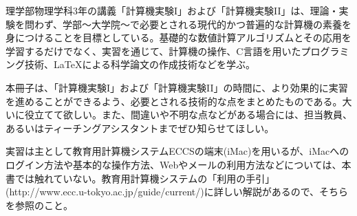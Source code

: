 
理学部物理学科3年の講義「計算機実験I」および「計算機実験II」は、理論・実験を問わず、学部〜大学院〜で必要とされる現代的かつ普遍的な計算機の素養を身につけることを目標としている。基礎的な数値計算アルゴリズムとその応用を学習するだけでなく、実習を通じて、計算機の操作、C言語を用いたプログラミング技術、\LaTeX による科学論文の作成技術などを学ぶ。

本冊子は、「計算機実験I」および「計算機実験II」の時間に、より効果的に実習を進めることができるよう、必要とされる技術的な点をまとめたものである。大いに役立てて欲しい。また、間違いや不明な点などがある場合には、担当教員、あるいはティーチングアシスタントまでぜひ知らせてほしい。

実習は主として教育用計算機システムECCSの端末(iMac)を用いるが、iMacへのログイン方法や基本的な操作方法、Webやメールの利用方法などについては、本書では触れていない。教育用計算機システムの「利用の手引」(http://www.ecc.u-tokyo.ac.jp/guide/current/)に詳しい解説があるので、そちらを参照のこと。






